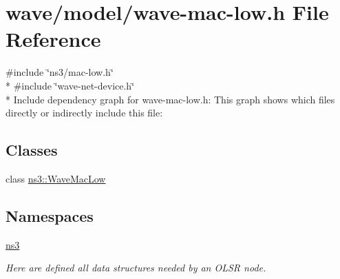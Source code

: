 \hypertarget{wave-mac-low_8h}{}\section{wave/model/wave-\/mac-\/low.h File Reference}
\label{wave-mac-low_8h}
{\ttfamily \#include \char`\"{}ns3/mac-\/low.\+h\char`\"{}}\\*
{\ttfamily \#include \char`\"{}wave-\/net-\/device.\+h\char`\"{}}\\*
Include dependency graph for wave-\/mac-\/low.h\+:
This graph shows which files directly or indirectly include this file\+:
\subsection*{Classes}
\begin{DoxyCompactItemize}
\item 
class \hyperlink{classns3_1_1WaveMacLow}{ns3\+::\+Wave\+Mac\+Low}
\end{DoxyCompactItemize}
\subsection*{Namespaces}
\begin{DoxyCompactItemize}
\item 
 \hyperlink{namespacens3}{ns3}
\begin{DoxyCompactList}\small\item\em Here are defined all data structures needed by an O\+L\+SR node. \end{DoxyCompactList}\end{DoxyCompactItemize}
